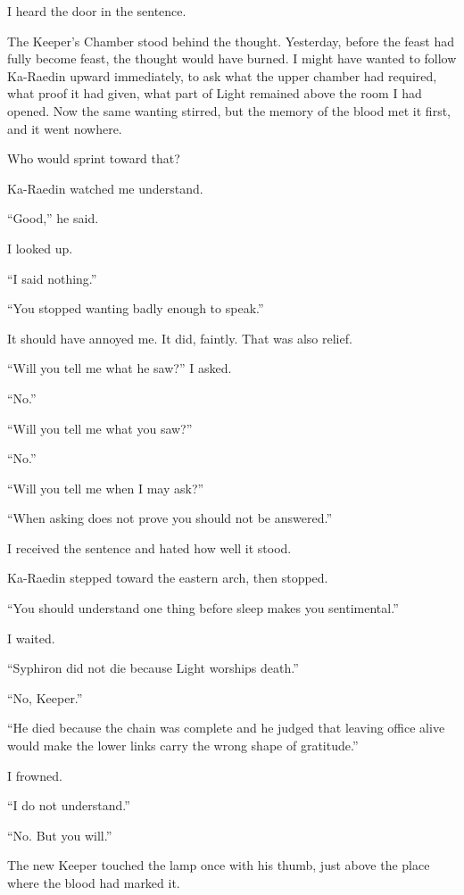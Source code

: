 I heard the door in the sentence.\par
The Keeper's Chamber stood behind the thought.
Yesterday, before the feast had fully become feast, the thought would have burned.
I might have wanted to follow Ka-Raedin upward immediately, to ask what the upper chamber had required, what proof it had given, what part of Light remained above the room I had opened.
Now the same wanting stirred, but the memory of the blood met it first, and it went nowhere.\par
Who would sprint toward that?\par
Ka-Raedin watched me understand.\par
``Good,'' he said.\par
I looked up.\par
``I said nothing.''\par
``You stopped wanting badly enough to speak.''\par
It should have annoyed me.
It did, faintly.
That was also relief.\par
``Will you tell me what he saw?'' I asked.\par
``No.''\par
``Will you tell me what you saw?''\par
``No.''\par
``Will you tell me when I may ask?''\par
``When asking does not prove you should not be answered.''\par
I received the sentence and hated how well it stood.\par
Ka-Raedin stepped toward the eastern arch, then stopped.\par
``You should understand one thing before sleep makes you sentimental.''\par
I waited.\par
``Syphiron did not die because Light worships death.''\par
``No, Keeper.''\par
``He died because the chain was complete and he judged that leaving office alive would make the lower links carry the wrong shape of gratitude.''\par
I frowned.\par
``I do not understand.''\par
``No.
But you will.''\par
The new Keeper touched the lamp once with his thumb, just above the place where the blood had marked it.\par
